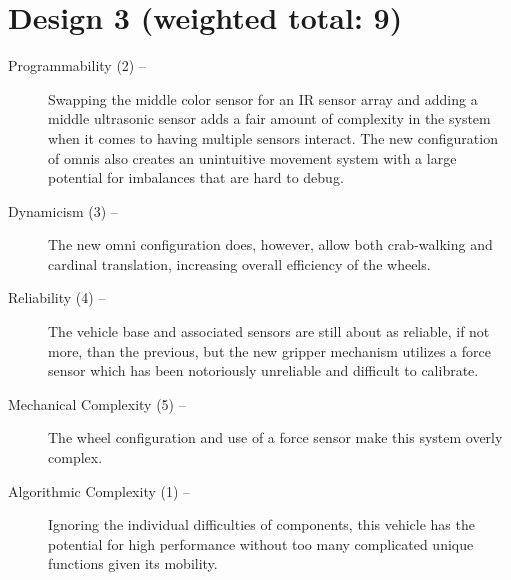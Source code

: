 \documentclass[11pt]{report}
\begin{document}
\section{Design 3 (weighted total: 9)}\label{matrixdesign3}
\begin{greylineformat}
\begin{description}
    \item[Programmability (2) --]Swapping the middle color sensor for an \gls{IR} sensor array and adding a middle ultrasonic sensor adds a fair amount of complexity in the system when it comes to having multiple sensors interact. The new configuration of \glspl{omni} also creates an unintuitive movement system with a large potential for imbalances that are hard to debug.
    \item[Dynamicism (3) --]The new \gls{omni} configuration does, however, allow both crab-walking and cardinal translation, increasing overall efficiency of the wheels.
    \item[Reliability (4) --]The vehicle base and associated sensors are still about as reliable, if not more, than the previous, but the new gripper mechanism utilizes a force sensor which has been notoriously unreliable and difficult to calibrate.
    \item[Mechanical Complexity (5) --]The wheel configuration and use of a force sensor make this system overly complex.
    \item[Algorithmic Complexity (1) --]Ignoring the individual difficulties of components, this vehicle has the potential for high performance without too many complicated unique functions given its mobility.
\end{description}
\end{greylineformat}
\end{document}
